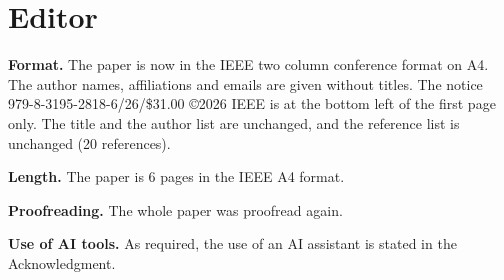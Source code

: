 \documentclass[11pt,a4paper]{article}
\newcommand{\pt}[1]{\textbf{#1}}
\begin{document}
\section*{Editor}

\pt{Format.} The paper is now in the IEEE two column conference format on A4. The author names, affiliations and
emails are given without titles. The notice 979-8-3195-2818-6/26/\$31.00 \copyright 2026 IEEE is at the bottom left
of the first page only. The title and the author list are unchanged, and the reference list is unchanged (20
references).

\pt{Length.} The paper is 6 pages in the IEEE A4 format.

\pt{Proofreading.} The whole paper was proofread again.

\pt{Use of AI tools.} As required, the use of an AI assistant is stated in the Acknowledgment.
\end{document}
